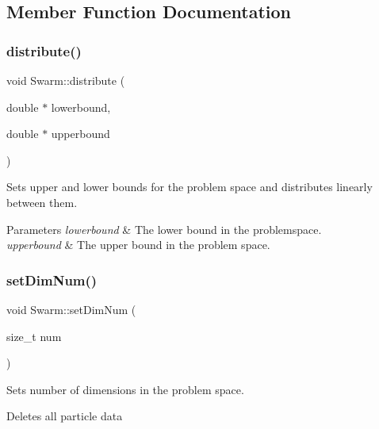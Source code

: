 \subsection{Member Function Documentation}
\mbox{\label{classSwarm_a9da23c6a5013d4d24b1591e6a44c803e}} 
\subsubsection{\texorpdfstring{distribute()}{distribute()}}
{\footnotesize\ttfamily void Swarm\+::distribute (\begin{DoxyParamCaption}\item[{double $\ast$}]{lowerbound,  }\item[{double $\ast$}]{upperbound }\end{DoxyParamCaption})}



Sets upper and lower bounds for the problem space and distributes linearly between them. 


\begin{DoxyParams}{Parameters}
{\em lowerbound} & The lower bound in the problemspace. \\
\hline
{\em upperbound} & The upper bound in the problem space. \\
\hline
\end{DoxyParams}
\mbox{\label{classSwarm_ad8214af418b80dc9a6f2d72ce2aeb5d4}} 
\subsubsection{\texorpdfstring{set\+Dim\+Num()}{setDimNum()}}
{\footnotesize\ttfamily void Swarm\+::set\+Dim\+Num (\begin{DoxyParamCaption}\item[{size\+\_\+t}]{num }\end{DoxyParamCaption})}



Sets number of dimensions in the problem space. 

Deletes all particle data \mbox{\label{classSwarm_a94c68335146f6eaa39bc7648236ccc61}} 
